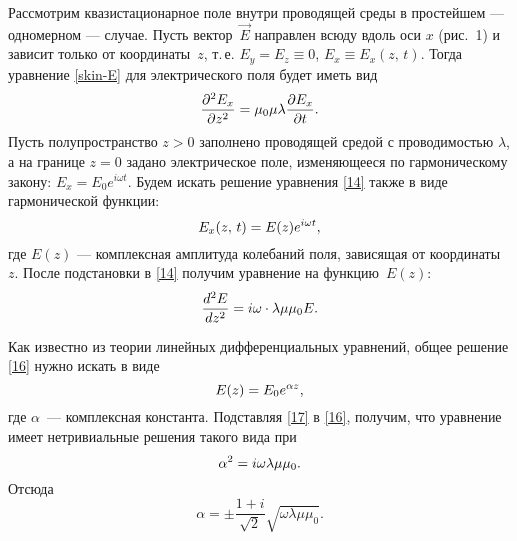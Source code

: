 



Рассмотрим квазистационарное поле внутри проводящей среды в простейшем --- одномерном --- случае.
Пусть вектор~$\vec{E}$ направлен всюду вдоль оси $x$ (рис.~1) и зависит 
только от координаты~$z$, т.\,е. $E_y=E_z\equiv 0$, $E_x\equiv E_x(z,\,t)$. 
Тогда уравнение \eqref{skin-E} для электрического поля будет иметь вид
\begin{equation} \eqmark{14}
\frac{\partial^2E_x}{\partial z^2}=\mu_0\mu\lambda\ddt{E_x}.
\end{equation}
Пусть полупространство $z>0$ заполнено проводящей средой с проводимостью $\lambda$, 
а на границе $z=0$ задано электрическое поле, изменяющееся по гармоническому закону: 
$E_x=E_0e^{i\omega t}$. Будем
искать решение уравнения \eqref{14} также в виде гармонической функции:
\begin{equation*} \eqmark{15}
E_x(z,\,t)=E(z)e^{i\omega t},
\end{equation*}
где $E(z)$ --- комплексная амплитуда колебаний поля, зависящая от координаты~$z$.
После подстановки в \eqref{14} получим уравнение на функцию~$E(z)$:
\begin{equation} \eqmark{16}
\frac{d^2E}{dz^2}=i\omega\cdot \lambda\mu\mu_0 E.
\end{equation}

Как известно из теории линейных дифференциальных уравнений, общее решение
\eqref{16} нужно искать в виде 
\begin{equation} \eqmark{17}
E(z)=E_0 e^{\alpha z},
\end{equation}
где $\alpha$~--- комплексная константа. 
Подставляя \eqref{17} в \eqref{16}, получим, что уравнение имеет
нетривиальные решения такого вида при
\begin{equation*} \eqmark{18}
\alpha^2=i\omega\lambda\mu\mu_0.
\end{equation*}
Отсюда
\begin{equation*}
\alpha=\pm\frac{1+i}{\sqrt{2}}\sqrt{\omega\lambda\mu\mu_0}.
\end{equation*}

